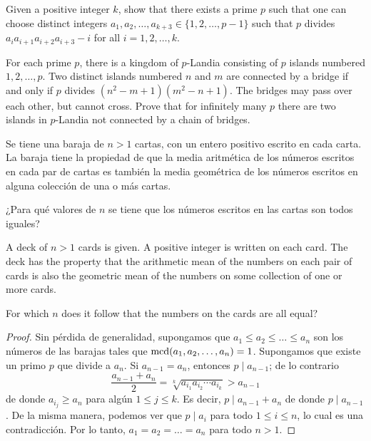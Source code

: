 
\begin{probEG}[ISL 2020/N1]
  Given a positive integer $k$, show that there exists a prime $p$ such that one
  can choose distinct integers $a_1,a_2,\dots,a_{k+3}\in\{1,2,\dots,p-1\}$ such
  that $p$ divides $a_ia_{i+1}a_{i+2}a_{i+3}-i$ for all $i=1,2,\dots,k$.
\end{probEG}

\begin{probMG}[ISL 2020/N2]
  For each prime $p$, there is a kingdom of $p$-Landia consisting of $p$ islands
  numbered $1,2,\dots,p$. Two distinct islands numbered $n$ and $m$ are
  connected by a bridge if and only if $p$ divides $(n^2-m+1)(m^2-n+1)$. The
  bridges may pass over each other, but cannot cross. Prove that for infinitely
  many $p$ there are two islands in $p$-Landia not connected by a chain of
  bridges.
\end{probMG}

\begin{probMG}
  Se tiene una baraja de $n>1$ cartas, con un entero positivo escrito en cada
  carta. La baraja tiene la propiedad de que la media aritmética de los números
  escritos en cada par de cartas es también la media geométrica de los números
  escritos en alguna colección de una o más cartas.

  ¿Para qué valores de $n$ se tiene que los números escritos en las cartas son
  todos iguales?
  \begin{hint}
    A deck of $n>1$ cards is given. A positive integer is written on each card.
    The deck has the property that the arithmetic mean of the numbers on each
    pair of cards is also the geometric mean of the numbers on some collection
    of one or more cards.

    For which $n$ does it follow that the numbers on the cards are all equal?
  \end{hint}
\end{probMG}

\begin{proof}
  Sin pérdida de generalidad, supongamos que $a_1\le a_2\le\dots\le a_n$ son los
  números de las barajas tales que $\operatorname{mcd}(a_1,a_2,\dots,a_n)=1$. Supongamos que
  existe un primo $p$ que divide a $a_n$. Si $a_{n-1}=a_n$, entonces
  $p\mid a_{n-1}$; de lo contrario
  \[\frac{a_{n-1}+a_n}{2}=\sqrt[k]{a_{i_1}a_{i_2}\cdots a_{i_k}}>a_{n-1}\]
  de donde $a_{i_j}\ge a_n$ para algún $1\le j\le k$. Es decir,
  $p\mid a_{n-1}+a_n$ de donde $p\mid a_{n-1}$. De la misma manera, podemos ver
  que $p\mid a_i$ para todo $1\le i\le n$, lo cual es una contradicción. Por lo
  tanto, $a_1=a_2=\dots=a_n$ para todo $n>1$.
\end{proof}

